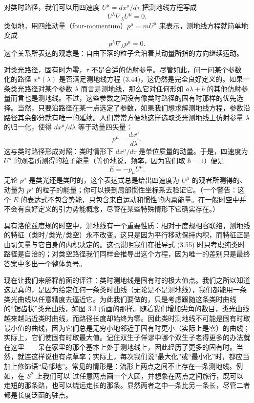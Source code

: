 对类时路径，我们可以用四速度 $U^\mu = dx^\mu/d\tau$ 把测地线方程写成
\begin{equation*}
U^\lambda\nabla_\lambda U^\mu = 0.
\tag{3.60}
\end{equation*}
类似地，用四维动量（four-momentum）$p^\mu = mU^\mu$ 来表示，测地线方程就简单地变成
\begin{equation*}
p^\lambda\nabla_\lambda p^\mu = 0.
\tag{3.61}
\end{equation*}
这个关系所表达的观念是：自由下落的粒子会沿着其动量所指的方向继续运动。

对类光路径，固有时为零，$\tau$ 不是合适的仿射参量。尽管如此，问一问某个参数
化的路径 $x^\mu(\lambda)$ 是否满足测地线方程 (3.44)，这仍然是完全良好定义的。如果一条类光路径对某个参数 $\lambda$ 而言是测地线，那么它对任何形如 $a\lambda + b$ 的其他仿射参量而言也是测地线。不过，这些参数之间没有像类时路径的固有时那样的优先选择。当然，只要沿路径在某一点选定了参数，如果我们想求解测地线方程，参数沿路径其余部分就有唯一的延续。人们常常方便地这样选取类光测地线上仿射参量 $\lambda$ 的归一化，使得 $dx^\mu/d\lambda$ 等于动量四矢量：
\begin{equation*}
p^\mu = \frac{dx^\mu}{d\lambda}.
\tag{3.62}
\end{equation*}
这与类时路径形成对照：类时情形下 $dx^\mu/d\tau$ 是单位质量的动量。于是，四速度为 $U^\mu$ 的观者所测得的粒子能量（等价地说，频率，因为我们取 $\hbar = 1$）便是
\begin{equation*}
E = -p_\mu U^\mu.
\tag{3.63}
\end{equation*}
无论 $p^\mu$ 是类光还是类时的，这个表达式总是给出四速度为 $U^\mu$ 的观者所测得的、动量为 $p^\mu$ 的粒子的能量；你可以换到局部惯性坐标系去验证它。（一个警告：这个 $E$ 的表达式不包含势能，只包含来自运动和惯性的内禀能量。在一般时空中并不会有良好定义的引力势能概念，尽管在某些特殊情形下它确实存在。）

具有洛伦兹度规的时空中，测地线有一个重要性质：相对于度规相容联络，测地线的特征（类时/类光/类空）永不改变。这只是因为平行移动保持内积，而特征正是由切矢量与它自身的内积决定的。这也说明我们在推导式 (3.55) 时只考虑纯类时路径是自洽的；对类空路径我们同样会推导出这个方程，因为唯一的差别只是最终答案中多出一个整体负号。

现在让我们来解释前面的评注：类时测地线是固有时的极大值点。我们之所以知道这是真的，是因为给定任何一条类时曲线（无论是不是测地线），我们都能用一条类光曲线以任意精度去逼近它。为此我们要做的，只是考虑跟随这条类时曲线的“锯齿状”类光曲线，如图 3.3 所画的那样。随着我们增加尖角的数目，类光曲线越来越贴近类时曲线，而路径长度却始终为零。因此类时测地线不可能是固有时取最小值的曲线，因为它们总是无穷小地邻近于固有时更小（实际上是零）的曲线；实际上，它们使固有时取最大值。记住双生子佯谬中哪个双生子老得更多的办法就在这里——呆在家里的那个基本上处于测地线上，因此经历了更多的固有时。当然，就连这样说也有点草率；实际上，每次我们说“最大化”或“最小化”时，都应当加上修饰语“局部地”。常见的情形是：流形上两点之间不止存在一条测地线。例如，在 $S^2$ 上我们可以
过任意两点画一个大圆，并想象在两点之间旅行，既可以走短的那条路，也可以绕远走长的那条。显然两者之中一条比另一条长，尽管二者都是长度泛函的驻点。

